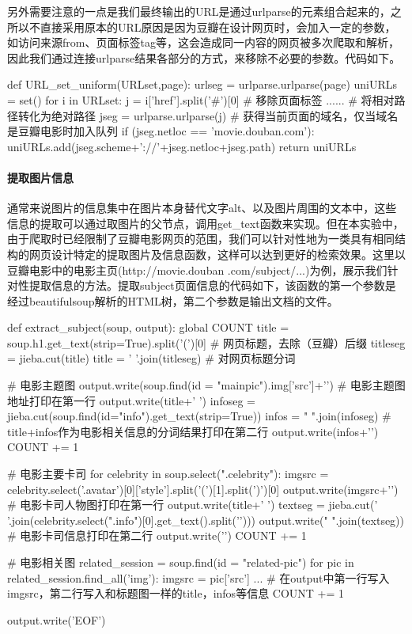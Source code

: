 \documentclass{article}
\begin{document}
另外需要注意的一点是我们最终输出的URL是通过urlparse的元素组合起来的，之所以不直接采用原本的URL原因是因为豆瓣在设计网页时，会加入一定的参数，如访问来源from、页面标签tag等，这会造成同一内容的网页被多次爬取和解析，因此我们通过连接urlparse结果各部分的方式，来移除不必要的参数。代码如下。

\begin{python}
def URL_set_uniform(URLset,page):
    urlseg = urlparse.urlparse(page)
    uniURLs = set()
    for i in URLset:
        j = i['href'].split('#')[0]      # 移除页面标签
        ......                           # 将相对路径转化为绝对路径
        jseg = urlparse.urlparse(j)      # 获得当前页面的域名，仅当域名是豆瓣电影时加入队列
        if (jseg.netloc == 'movie.douban.com'):
            uniURLs.add(jseg.scheme+'://'+jseg.netloc+jseg.path)
    return uniURLs
\end{python}


\paragraph{提取图片信息}
通常来说图片的信息集中在图片本身替代文字alt、以及图片周围的文本中，这些信息的提取可以通过取图片的父节点，调用get\_text函数来实现。但在本实验中，由于爬取时已经限制了豆瓣电影网页的范围，我们可以针对性地为一类具有相同结构的网页设计特定的提取图片及信息函数，这样可以达到更好的检索效果。这里以豆瓣电影中的电影主页(http://movie.douban .com/subject/...)为例，展示我们针对性提取信息的方法。提取subject页面信息的代码如下，该函数的第一个参数是经过beautifulsoup解析的HTML树，第二个参数是输出文档的文件。

\begin{python}
def extract_subject(soup, output):
    global COUNT
    title = soup.h1.get_text(strip=True).split('(')[0]          # 网页标题，去除（豆瓣）后缀
    titleseg = jieba.cut(title)
    title = ' '.join(titleseg)                                  # 对网页标题分词

    # 电影主题图
    output.write(soup.find(id = "mainpic").img['src']+'\n')     # 电影主题图地址打印在第一行
    output.write(title+' ')
    infoseg = jieba.cut(soup.find(id="info").get_text(strip=True))
    infos = " ".join(infoseg)              # title+infos作为电影相关信息的分词结果打印在第二行
    output.write(infos+'\n')
    COUNT += 1
    
    # 电影主要卡司
    for celebrity in soup.select(".celebrity"):
        imgsrc = celebrity.select('.avatar')[0]['style'].split('(')[1].split(')')[0]
        output.write(imgsrc+'\n')                               # 电影卡司人物图打印在第一行
        output.write(title+' ')
        textseg = jieba.cut(' '.join(celebrity.select(".info")[0].get_text().split('\n')))
        output.write(" ".join(textseg))                         # 电影卡司信息打印在第二行
        output.write('\n')
        COUNT += 1
        
    # 电影相关图
    related_session = soup.find(id = "related-pic")
    for pic in related_session.find_all('img'):
        imgsrc = pic['src']
        ...    # 在output中第一行写入imgsrc，第二行写入和标题图一样的title，infos等信息
        COUNT += 1

    output.write('EOF')
\end{python}
\end{document}
